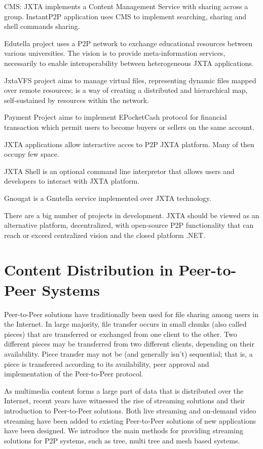 CMS: JXTA implements a Content Management Service with sharing across a group.
InstantP2P application uses CMS to implement searching, sharing and shell
commands sharing.

Edutella project uses a P2P network to exchange educational resources between
various universities. The vision is to provide meta-information services,
necessarily to enable interoperability between heterogeneous JXTA applications.

JxtaVFS project aims to manage virtual files, representing dynamic files mapped
over remote resources; is a way of creating a distributed and hierarchical map,
self-sustained by resources within the network.

Payment Project aims to implement EPocketCash protocol for financial
transaction which permit users to become buyers or sellers on the same account.

JXTA applications allow interactive acces to P2P JXTA platform. Many of then
occupy few space.

JXTA Shell is an optional command line interpretor that allows users and
developers to interact with JXTA platform.

Gnougat is a Gnutella service implemented over JXTA technology.

There are a big number of projects in development. JXTA should be viewed as an
alternative platform, decentralized, with open-source P2P functionality that
can reach or exceed centralized vision and the closed platform .NET.

\section{Content Distribution in Peer-to-Peer Systems}
\label{sec:p2p-systems:streaming}

Peer-to-Peer solutions have traditionally been used for file sharing among
users in the Internet. In large majority, file transfer occurs in small
chunks (also called pieces) that are transferred or exchanged from one client
to the other. Two different pieces may be transferred from two different
clients, depending on their availability. Piece transfer may not be (and
generally isn't) sequential; that is, a piece is transferred according to its
availability, peer approval and implementation of the Peer-to-Peer protocol.

As multimedia content forms a large part of data that is distributed over the
Internet, recent years have witnessed the rise of streaming solutions and
their introduction to Peer-to-Peer solutions. Both live streaming and
on-demand video streaming have been added to existing Peer-to-Peer solutions
of new applications have been designed. We introduce the main methods for
providing streaming solutions for P2P systems, such as tree, multi tree and
mesh based systems.

